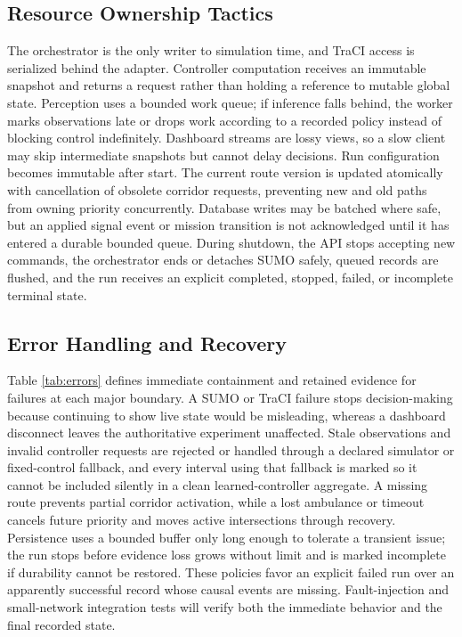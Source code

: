 \subsection{Resource Ownership Tactics}

The orchestrator is the only writer to simulation time, and TraCI access is serialized behind the adapter. Controller computation receives an immutable snapshot and returns a request rather than holding a reference to mutable global state. Perception uses a bounded work queue; if inference falls behind, the worker marks observations late or drops work according to a recorded policy instead of blocking control indefinitely. Dashboard streams are lossy views, so a slow client may skip intermediate snapshots but cannot delay decisions. Run configuration becomes immutable after start. The current route version is updated atomically with cancellation of obsolete corridor requests, preventing new and old paths from owning priority concurrently. Database writes may be batched where safe, but an applied signal event or mission transition is not acknowledged until it has entered a durable bounded queue. During shutdown, the API stops accepting new commands, the orchestrator ends or detaches SUMO safely, queued records are flushed, and the run receives an explicit completed, stopped, failed, or incomplete terminal state.

\subsection{Error Handling and Recovery}

Table \ref{tab:errors} defines immediate containment and retained evidence for failures at each major boundary. A SUMO or TraCI failure stops decision-making because continuing to show live state would be misleading, whereas a dashboard disconnect leaves the authoritative experiment unaffected. Stale observations and invalid controller requests are rejected or handled through a declared simulator or fixed-control fallback, and every interval using that fallback is marked so it cannot be included silently in a clean learned-controller aggregate. A missing route prevents partial corridor activation, while a lost ambulance or timeout cancels future priority and moves active intersections through recovery. Persistence uses a bounded buffer only long enough to tolerate a transient issue; the run stops before evidence loss grows without limit and is marked incomplete if durability cannot be restored. These policies favor an explicit failed run over an apparently successful record whose causal events are missing. Fault-injection and small-network integration tests will verify both the immediate behavior and the final recorded state.

